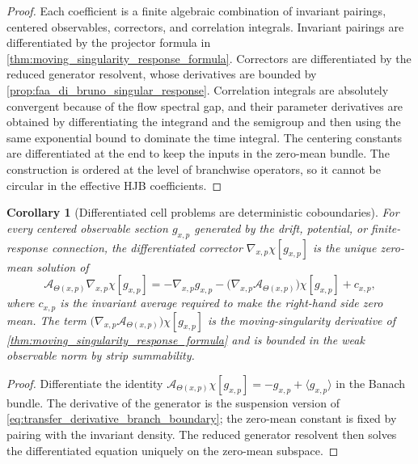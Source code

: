 \documentclass[12pt, letterpaper]{amsart}
\newcommand{\Acal}{\mathcal{A}}
\theoremstyle{plain}
\newtheorem{corollary}[theorem]{Corollary}
\theoremstyle{definition}
\theoremstyle{remark}
\begin{document}
\begin{proof}
Each coefficient is a finite algebraic combination of invariant pairings,
centered observables, correctors, and correlation integrals.  Invariant
pairings are differentiated by the projector formula in
\cref{thm:moving_singularity_response_formula}.  Correctors are differentiated
by the reduced generator resolvent, whose derivatives are bounded by
\cref{prop:faa_di_bruno_singular_response}.  Correlation integrals are
absolutely convergent because of the flow spectral gap, and their parameter
derivatives are obtained by differentiating the integrand and the semigroup and
then using the same exponential bound to dominate the time integral.  The
centering constants are differentiated at the end to keep the inputs in the
zero-mean bundle.  The construction is ordered at the level of branchwise
operators, so it cannot be circular in the effective HJB coefficients.
\end{proof}

\begin{corollary}[Differentiated cell problems are deterministic coboundaries]
\label{cor:differentiated_cell_coboundaries}
For every centered observable section $g_{x,p}$ generated by the drift,
potential, or finite-response connection, the differentiated corrector
$\nabla_{x,p}\chi[g_{x,p}]$ is the unique zero-mean solution of
\begin{equation}
    \Acal_{\Theta(x,p)}\nabla_{x,p}\chi[g_{x,p}]
    =-\nabla_{x,p}g_{x,p}
      -\big(\nabla_{x,p}\Acal_{\Theta(x,p)}\big)\chi[g_{x,p}]
      +c_{x,p},
\end{equation}
where $c_{x,p}$ is the invariant average required to make the right-hand side
zero mean.  The term
$\big(\nabla_{x,p}\Acal_{\Theta(x,p)}\big)\chi[g_{x,p}]$ is the
moving-singularity derivative of \cref{thm:moving_singularity_response_formula}
and is bounded in the weak observable norm by strip summability.
\end{corollary}

\begin{proof}
Differentiate the identity
$\Acal_{\Theta(x,p)}\chi[g_{x,p}]=-g_{x,p}+\langle g_{x,p}\rangle$ in the
Banach bundle.  The derivative of the generator is the suspension version of
\eqref{eq:transfer_derivative_branch_boundary}; the zero-mean constant is fixed
by pairing with the invariant density.  The reduced generator resolvent then
solves the differentiated equation uniquely on the zero-mean subspace.
\end{proof}
\end{document}
